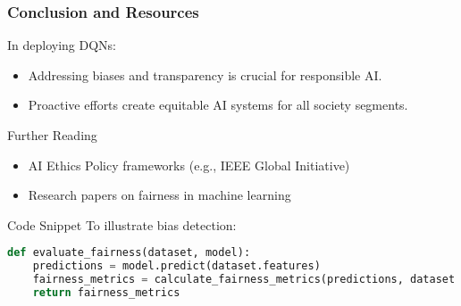 \documentclass[aspectratio=169]{beamer}
\begin{document}
\begin{frame}[fragile]
    \frametitle{Conclusion and Resources}
    In deploying DQNs:
    \begin{itemize}
        \item Addressing biases and transparency is crucial for responsible AI.
        \item Proactive efforts create equitable AI systems for all society segments.
    \end{itemize}

    \begin{block}{Further Reading}
        \begin{itemize}
            \item AI Ethics Policy frameworks (e.g., IEEE Global Initiative)
            \item Research papers on fairness in machine learning
        \end{itemize}
    \end{block}

    \begin{block}{Code Snippet}
        To illustrate bias detection:
        \begin{lstlisting}[language=Python]
def evaluate_fairness(dataset, model):
    predictions = model.predict(dataset.features)
    fairness_metrics = calculate_fairness_metrics(predictions, dataset.labels)
    return fairness_metrics
        \end{lstlisting}
    \end{block}
\end{frame}
\end{document}
